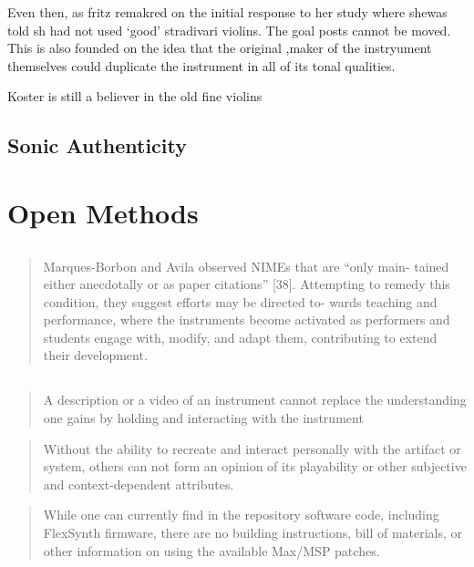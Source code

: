 Even then, as fritz remakred on the initial response to her study where shewas
told sh had not used `good' stradivari violins. The goal posts cannot be moved.
This  is also founded on the idea that the original ,maker of the instryument
themselves could duplicate the instrument in all of its tonal qualities.


Koster is still a believer in the old fine violins


\subsection{Sonic Authenticity}


\section{Open Methods}

\subsection{\cite{clarke_longevity_2025}}

\begin{quotation}
Marques-Borbon and Avila observed NIMEs that are “only main- tained either
anecdotally or as paper citations” [38]. Attempting to remedy this condition,
they suggest efforts may be directed to- wards teaching and performance, where
the instruments become activated as performers and students engage with, modify,
and adapt them, contributing to extend their development. 
\end{quotation}

\subsection{\cite{calegario_documentation_2021}}

\begin{quotation}
    A description or a video of an instrument cannot replace the understanding
    one gains by holding and interacting with the instrument
\end{quotation}

\begin{quotation}
Without the ability to recreate and interact personally with the artifact or
system, others can not form an opinion of its playability or other subjective
and context-dependent attributes.
\end{quotation}

\begin{quotation}
While one can currently find in the repository software code, including
FlexSynth firmware, there are no building instructions, bill of materials, or
other information on using the available Max/MSP patches.
\end{quotation}

